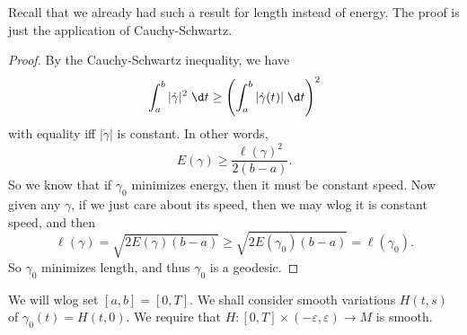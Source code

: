 \documentclass[a4paper]{article}
\begin{document}
Recall that we already had such a result for length instead of energy. The proof is just the application of Cauchy-Schwartz.

\begin{proof}
  By the Cauchy-Schwartz inequality, we have
  \[
    \int_a^b |\dot{\gamma}|^2\; \d t \geq \left(\int_a^b |\dot{\gamma}(t)|\;\d t\right)^2
  \]
  with equality iff $|\dot{\gamma}|$ is constant. In other words,
  \[
    E(\gamma) \geq \frac{\ell(\gamma)^2}{2(b - a)}.
  \]
  So we know that if $\gamma_0$ minimizes energy, then it must be constant speed. Now given any $\gamma$, if we just care about its speed, then we may wlog it is constant speed, and then
  \[
    \ell(\gamma) = \sqrt{2E(\gamma) (b - a) }\geq \sqrt{2 E(\gamma_0) (b - a)} = \ell(\gamma_0).
  \]
  So $\gamma_0$ minimizes length, and thus $\gamma_0$ is a geodesic.
\end{proof}
We will wlog set $[a, b] = [0, T]$. We shall consider smooth variations $H(t, s)$ of $\gamma_0(t) = H(t, 0)$. We require that $H: [0, T] \times (-\varepsilon, \varepsilon) \to M$ is smooth.
\end{document}
